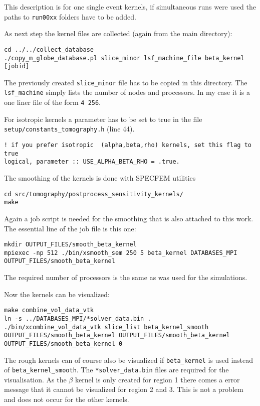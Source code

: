 This description is for one single event kernels, if simultaneous runs were used
the paths to \texttt{run00xx} folders have to be added.

As next step the kernel files are collected (again from the main directory):
\begin{lstlisting} 
cd ../../collect_database
./copy_m_globe_database.pl slice_minor lsf_machine_file beta_kernel [jobid]
\end{lstlisting}

The previously created \texttt{slice\_minor} file has to be copied in this
directory. The \texttt{lsf\_machine} simply lists the number of nodes and processors. In my case it is a one liner file of the form \texttt{4 256}.

For isotropic kernels a parameter has to be set to true in the file 
\texttt{setup/constants\_tomography.h} (line 44).
\begin{lstlisting}
! if you prefer isotropic  (alpha,beta,rho) kernels, set this flag to true
logical, parameter :: USE_ALPHA_BETA_RHO = .true.
\end{lstlisting}

The smoothing of the kernels is done with SPECFEM utilities
\begin{lstlisting} 
cd src/tomography/postprocess_sensitivity_kernels/
make
\end{lstlisting}

Again a job script is needed for the smoothing that is also attached to this work.
The essential line of the job file is this one:
\begin{lstlisting} 
mkdir OUTPUT_FILES/smooth_beta_kernel
mpiexec -np 512 ./bin/xsmooth_sem 250 5 beta_kernel DATABASES_MPI OUTPUT_FILES/smooth_beta_kernel
\end{lstlisting}
The required number of processors is the same as was used for the simulations.

Now the kernels can be visualized:
\begin{lstlisting} 
make combine_vol_data_vtk
ln -s ../DATABASES_MPI/*solver_data.bin .
./bin/xcombine_vol_data_vtk slice_list beta_kernel_smooth OUTPUT_FILES/smooth_beta_kernel OUTPUT_FILES/smooth_beta_kernel OUTPUT_FILES/smooth_beta_kernel 0
\end{lstlisting}

The rough kernels can of course also be visualized if 
\texttt{beta\_kernel} is used instead of \texttt{beta\_kernel\_smooth}.
The \texttt{*solver\_data.bin} files are required for the visualisation.
As the $\beta$ kernel is only created for region 1 there comes a error message that 
it cannot be visualized for region 2 and 3. This is not a problem and does not occur
for the other kernels.

